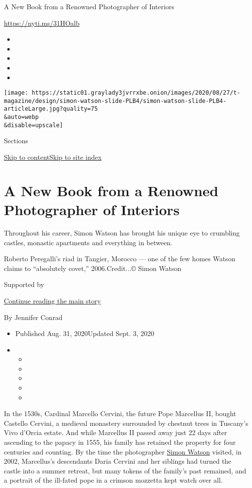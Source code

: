 A New Book from a Renowned Photographer of Interiors

\url{https://nyti.ms/31HOalb}

\begin{itemize}
\item
\item
\item
\item
\item
\end{itemize}

\texttt{[image: https://static01.graylady3jvrrxbe.onion/images/2020/08/27/t-magazine/design/simon-watson-slide-PLB4/simon-watson-slide-PLB4-articleLarge.jpg?quality=75\\\&auto=webp\\\&disable=upscale]}

Sections

\protect\hyperlink{site-content}{Skip to
content}\protect\hyperlink{site-index}{Skip to site index}

\hypertarget{a-new-book-from-a-renowned-photographer-of-interiors}{%
\section{A New Book from a Renowned Photographer of
Interiors}\label{a-new-book-from-a-renowned-photographer-of-interiors}}

Throughout his career, Simon Watson has brought his unique eye to
crumbling castles, monastic apartments and everything in between.

Roberto Peregalli's riad in Tangier, Morocco --- one of the few homes
Watson claims to ``absolutely covet,'' 2006.Credit...© Simon Watson

Supported by

\protect\hyperlink{after-sponsor}{Continue reading the main story}

By Jennifer Conrad

\begin{itemize}
\item
  Published Aug. 31, 2020Updated Sept. 3, 2020
\item
  \begin{itemize}
  \item
  \item
  \item
  \item
  \item
  \end{itemize}
\end{itemize}

In the 1530s, Cardinal Marcello Cervini, the future Pope Marcellus II,
bought Castello Cervini, a medieval monastery surrounded by chestnut
trees in Tuscany's Vivo d'Orcia estate. And while Marcellus II passed
away just 22 days after ascending to the papacy in 1555, his family has
retained the property for four centuries and counting. By the time the
photographer
\href{https://www.nytimes3xbfgragh.onion/2019/12/13/t-magazine/decade-in-photos-simon-watson.html}{Simon
Watson} visited, in 2002, Marcellus's descendants Daria Cervini and her
siblings had turned the castle into a summer retreat, but many tokens of
the family's past remained, and a portrait of the ill-fated pope in a
crimson mozzetta kept watch over all.

